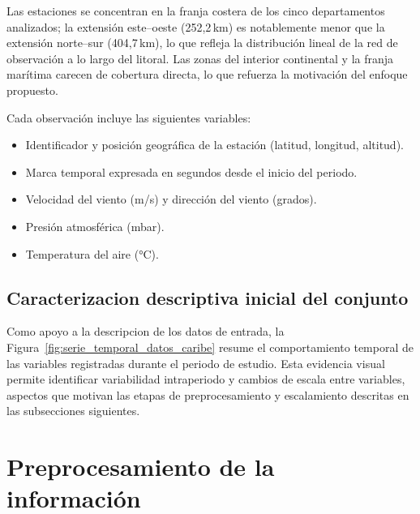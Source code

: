Las estaciones se concentran en la franja costera de los cinco departamentos analizados; la extensión este–oeste (252{,}2\,km) es notablemente menor que la extensión norte–sur (404{,}7\,km), lo que refleja la distribución lineal de la red de observación a lo largo del litoral. Las zonas del interior continental y la franja marítima carecen de cobertura directa, lo que refuerza la motivación del enfoque propuesto.

Cada observación incluye las siguientes variables:

\begin{itemize}
	\item Identificador y posición geográfica de la estación (latitud, longitud, altitud).
	\item Marca temporal expresada en segundos desde el inicio del periodo.
	\item Velocidad del viento (m/s) y dirección del viento (grados).
	\item Presión atmosférica (mbar).
	\item Temperatura del aire (°C).
\end{itemize}

\subsection{Caracterizacion descriptiva inicial del conjunto}

Como apoyo a la descripcion de los datos de entrada, la Figura~\ref{fig:serie_temporal_datos_caribe} resume el comportamiento temporal de las variables registradas durante el periodo de estudio. Esta evidencia visual permite identificar variabilidad intraperiodo y cambios de escala entre variables, aspectos que motivan las etapas de preprocesamiento y escalamiento descritas en las subsecciones siguientes.


\section{Preprocesamiento de la información}

